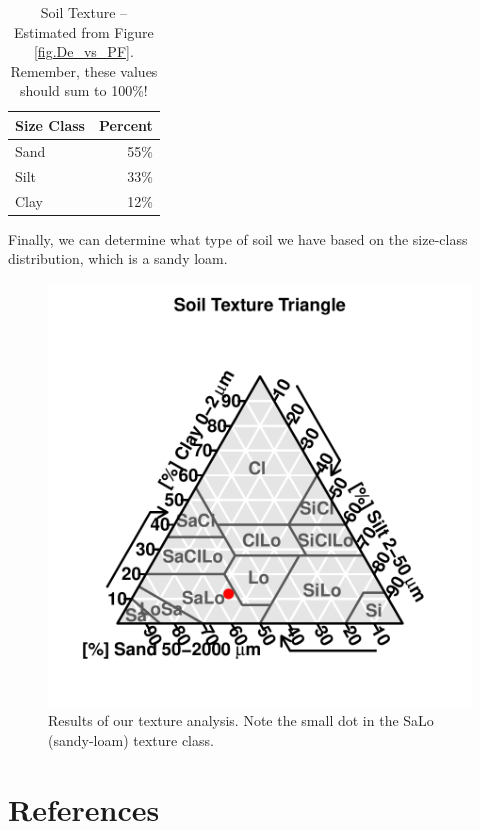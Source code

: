 \documentclass{tufte-handout}
\begin{document}
\begin{table}

		\begin{tabular}{lr}\hline
Size Class 	&		Percent		\\ \hline\hline
Sand				& 	55\% \\
Silt				&   33\% \\
Clay				& 	12\% \\ \hline		
		\end{tabular}
	\caption{Soil Texture -- Estimated from Figure \ref{fig.De_vs_PF}. Remember, these values should sum to 100\%!}
	\label{tab:SoilTexture}
\end{table}

Finally, we can determine what type of soil we have based on the size-class distribution, which is a sandy loam. 


\begin{figure}
\includegraphics{Soil_Texture_Analysis_160815-TTPlot}
\caption{Results of our texture analysis. Note the small dot in the SaLo (sandy-loam) texture class.}
\label{fig.simplifiedfig}
\end{figure}


\section{References}
\end{document}
